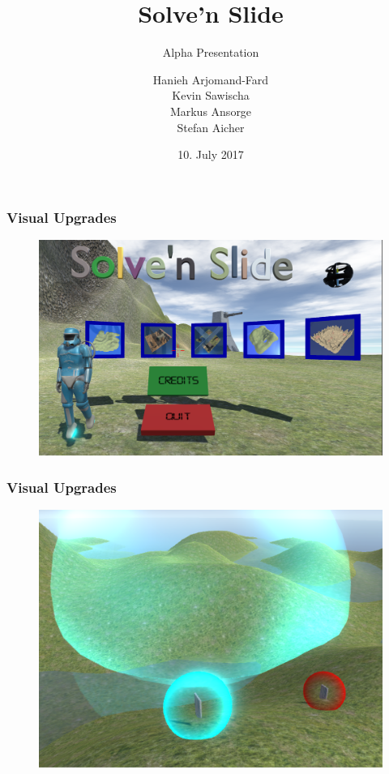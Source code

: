 \documentclass[xcolor=dvipsnames]{beamer}
\title{Solve'n Slide}
\subtitle{Alpha Presentation}
\author{Hanieh Arjomand-Fard\\Kevin Sawischa\\Markus Ansorge\\Stefan Aicher}
\date{10. July 2017}
\begin{document}
	\maketitle
	
	\begin{frame}
		\frametitle{Visual Upgrades}
		\begin{figure}[H]
			\centering
			\includegraphics[width=\textwidth]{images/playtesting/MainMenu2}
		\end{figure}
	\end{frame}
	
	\begin{frame}
		\frametitle{Visual Upgrades}
		\begin{figure}[H]
			\centering
			\includegraphics[scale=0.7]{images/playtesting/KeysForceField}
		\end{figure}
	\end{frame}
	
\end{document}
